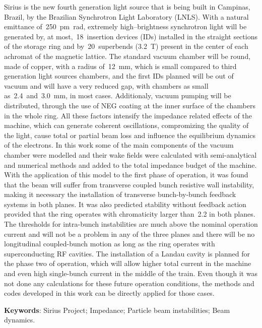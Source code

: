 \begin{resumo}
    Sirius is the new fourth generation light source that is being built in Campinas, Brazil, by the Brazilian Synchrotron Light Laboratory (LNLS). With a natural emittance of~\SI{250}{\pico\meter\radian}, extremely high--brightness synchrotron light will be generated by, at most,~\num{18}~insertion devices (IDs) installed in the straight sections of the storage ring and by~\num{20}~superbends (\SI{3.2}{\tesla}) present in the center of each achromat of the magnetic lattice. The standard vacuum chamber will be round, made of copper, with a radius of~\SI{12}{\milli\meter}, which is small compared to third generation light sources chambers, and the first IDs planned will be out of vacuum and will have a very reduced gap, with chambers as small as~\num{2.4}~and~\SI{3.0}{\milli\meter}, in most cases. Additionaly, vacuum pumping will be distributed, through the use of NEG coating at the inner surface of the chambers in the whole ring. All these factors intensify the impedance related effects of the machine, which can generate coherent oscillations, compromizing the quality of the light, cause total or partial beam loss and influence the equilibrium dynamics of the electrons. In this work some of the main components of the vacuum chamber were modelled and their wake fields were calculated with semi-analytical and numerical methods and added to the total impedance budget of the machine. With the application of this model to the first phase of operation, it was found that the beam will suffer from transverse coupled bunch resistive wall instability, making it necessary the installation of transverse bunch-by-bunch feedback systems in both planes. It was also predicted stability without feedback action provided that the ring operates with chromaticity larger than~\num{2.2} in both planes. The thresholds for intra-bunch instabilities are much above the nominal operation current and will not be a problem in any of the three planes and there will be no longitudinal coupled-bunch motion as long as the ring operates with superconducting RF cavities. The installation of a Landau cavity is planned for the phase two of operation, which will allow higher total current in the machine and even high single-bunch current in the middle of the train. Even though it was not done any calculations for these future operation conditions, the methods and codes developed in this work can be directly applied for those cases.

    \noindent\textbf{Keywords}: Sirius Project; Impedance; Particle beam instabilities; Beam dynamics.
    \vspace{\fill}
\end{resumo}

